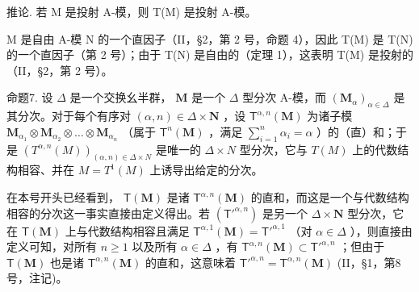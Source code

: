推论. 若 M 是投射 A-模，则 T(M) 是投射 A-模。

M 是自由 A-模 N 的一个直因子（II，§2，第 2 号，命题 4），因此 T(M) 是 T(N) 的一个直因子（第 2 号）；由于 T(N) 是自由的（定理 1），这表明 T(M) 是投射的（II，§2，第 2 号）。

命题7. 设 \(\Delta\) 是一个交换幺半群， \(\mathbf{M}\) 是一个 \(\Delta\) 型分次 A-模，而 \((\mathbf{M}_{\alpha})_{\alpha \in \Delta}\) 是其分次。对于每个有序对 \((\alpha, n) \in \Delta \times \mathbf{N}\) ，设 \(\mathsf{T}^{\alpha,n}(\mathbf{M})\) 为诸子模 \(\mathbf{M}_{\alpha_1} \otimes \mathbf{M}_{\alpha_2} \otimes \dots \otimes \mathbf{M}_{\alpha_n}\) （属于 \(\mathsf{T}^n(\mathbf{M})\) ，满足 \(\sum_{i=1}^{n} \alpha_i = \alpha\) ）的（直）和；于是 \((T^{\alpha, n}(M))_{(\alpha, n) \in \Delta \times N}\) 是唯一的 \(\Delta \times N\) 型分次，它与 \(T(M)\) 上的代数结构相容、并在 \(M = T^1(M)\) 上诱导出给定的分次。

在本号开头已经看到， \(\mathsf{T}(\mathbf{M})\) 是诸 \(\mathsf{T}^{\alpha,n}(\mathbf{M})\) 的直和，而这是一个与代数结构相容的分次这一事实直接由定义得出。若 \((\mathsf{T}'^{\alpha,n})\) 是另一个 \(\Delta \times \mathbf{N}\) 型分次，它在 \(\mathsf{T}(\mathbf{M})\) 上与代数结构相容且满足 \(\mathsf{T}^{\alpha,1}(\mathbf{M}) = \mathsf{T}'^{\alpha,1}\) （对 \(\alpha \in \Delta\) ），则直接由定义可知，对所有 \(n \geqslant 1\) 以及所有 \(\alpha \in \Delta\) ，有 \(\mathsf{T}^{\alpha,n}(\mathbf{M}) \subset \mathsf{T}'^{\alpha,n}\) ；但由于 \(\mathsf{T}(\mathbf{M})\) 也是诸 \(\mathsf{T}^{\alpha,n}(\mathbf{M})\) 的直和，这意味着 \(\mathsf{T}'^{\alpha,n} = \mathsf{T}^{\alpha,n}(\mathbf{M})\) (II，§1，第8号，注记)。

